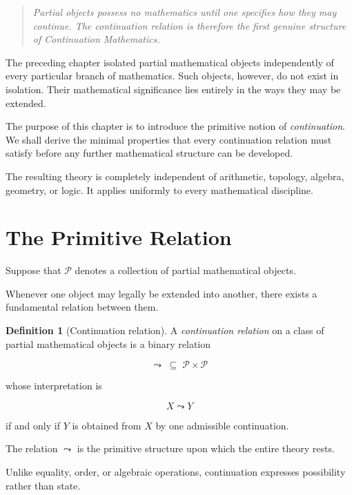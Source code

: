 \documentclass[13pt,openany]{book}
\theoremstyle{plain}
\theoremstyle{definition}
\newtheorem{definition}{Definition}[chapter]
\begin{document}
\begin{quote}
\emph{Partial objects possess no mathematics until one specifies how they
may continue. The continuation relation is therefore the first genuine
structure of Continuation Mathematics.}
\end{quote}

\vspace{1em}

The preceding chapter isolated partial mathematical objects independently
of every particular branch of mathematics. Such objects, however, do not
exist in isolation. Their mathematical significance lies entirely in the
ways they may be extended.

The purpose of this chapter is to introduce the primitive notion of
\emph{continuation}. We shall derive the minimal properties that every
continuation relation must satisfy before any further mathematical
structure can be developed.

The resulting theory is completely independent of arithmetic, topology,
algebra, geometry, or logic. It applies uniformly to every mathematical
discipline.

\section{The Primitive Relation}

Suppose that \(\mathcal{P}\) denotes a collection of partial mathematical
objects.

Whenever one object may legally be extended into another, there exists a
fundamental relation between them.

\begin{definition}[Continuation relation]
A \emph{continuation relation} on a class of partial mathematical objects
is a binary relation

\[
\leadsto
\;\subseteq\;
\mathcal P\times\mathcal P
\]

whose interpretation is

\[
X\leadsto Y
\]

if and only if \(Y\) is obtained from \(X\) by one admissible
continuation.
\end{definition}

The relation \(\leadsto\) is the primitive structure upon which the entire
theory rests.

Unlike equality, order, or algebraic operations, continuation expresses
possibility rather than state.
\end{document}

